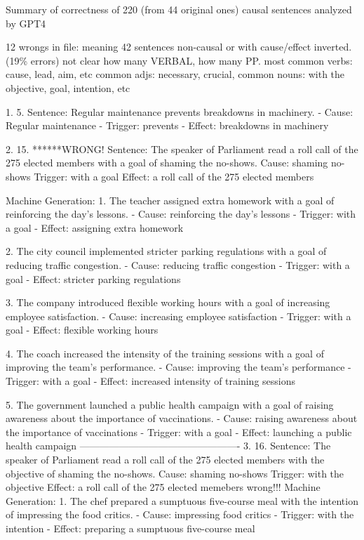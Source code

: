 Summary of correctness of 220 (from 44 original ones) causal sentences analyzed by GPT4

12 wrongs in file: meaning 42 sentences non-causal or with cause/effect inverted. (19\% errors)
not clear how many VERBAL, how many PP.
most common verbs: cause, lead, aim, etc
common adjs: necessary, crucial, 
common nouns: with the objective, goal, intention, etc

1.
5.
Sentence: Regular maintenance prevents breakdowns in machinery.
   - Cause: Regular maintenance
   - Trigger: prevents
   - Effect: breakdowns in machinery
   
   
2.
15. ******WRONG!
Sentence: The speaker of Parliament read a roll call of the 275 elected members with a goal of shaming the no-shows.
Cause: shaming no-shows
Trigger: with a goal
Effect: a roll call of the 275 elected members

Machine Generation: 
1. The teacher assigned extra homework with a goal of reinforcing the day's lessons.
   - Cause: reinforcing the day's lessons
   - Trigger: with a goal
   - Effect: assigning extra homework

2. The city council implemented stricter parking regulations with a goal of reducing traffic congestion.
   - Cause: reducing traffic congestion
   - Trigger: with a goal
   - Effect: stricter parking regulations

3. The company introduced flexible working hours with a goal of increasing employee satisfaction.
   - Cause: increasing employee satisfaction
   - Trigger: with a goal
   - Effect: flexible working hours

4. The coach increased the intensity of the training sessions with a goal of improving the team's performance.
   - Cause: improving the team's performance
   - Trigger: with a goal
   - Effect: increased intensity of training sessions

5. The government launched a public health campaign with a goal of raising awareness about the importance of vaccinations.
   - Cause: raising awareness about the importance of vaccinations
   - Trigger: with a goal
   - Effect: launching a public health campaign
-------------------------------------------------
3.
16.
Sentence: The speaker of Parliament read a roll call of the 275 elected members with the objective of shaming the no-shows.
Cause: shaming no-shows
Trigger: with the objective
Effect: a roll call of the 275 elected memebers
wrong!!!
Machine Generation: 
1. The chef prepared a sumptuous five-course meal with the intention of impressing the food critics.
   - Cause: impressing food critics
   - Trigger: with the intention
   - Effect: preparing a sumptuous five-course meal

